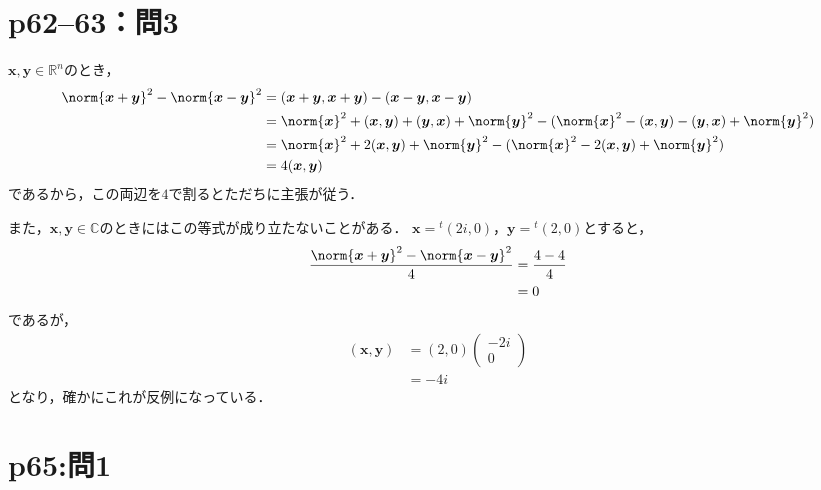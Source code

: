 \section*{p62--63：問3}

\begin{tproof}
  $\bm{x},\bm{y} \in \mathbb{R}^n$のとき，
  \begin{align*}
    \norm{\bm{x}+\bm{y}}^2 - \norm{\bm{x}-\bm{y}}^2 & = (\bm{x}+\bm{y},\bm{x}+\bm{y}) - (\bm{x}-\bm{y},\bm{x}-\bm{y})                                                                          \\
                                                    & = \norm{\bm{x}}^2 +(\bm{x},\bm{y})+(\bm{y},\bm{x})+ \norm{\bm{y}}^2 - (\norm{\bm{x}}^2 -(\bm{x},\bm{y})-(\bm{y},\bm{x})+\norm{\bm{y}}^2) \\
                                                    & = \norm{\bm{x}}^2 + 2(\bm{x},\bm{y}) + \norm{\bm{y}}^2 - (\norm{\bm{x}}^2 - 2(\bm{x},\bm{y}) + \norm{\bm{y}}^2)                          \\
                                                    & = 4(\bm{x},\bm{y})
  \end{align*}
  であるから，この両辺を$4$で割るとただちに主張が従う．

  また，$\bm{x},\bm{y} \in \mathbb{C}$のときにはこの等式が成り立たないことがある．
  $\bm{x}={}^t (2i,0)$，$\bm{y}={}^t (2,0)$とすると，
  \begin{align*}
    \frac{\norm{\bm{x}+\bm{y}}^2 - \norm{\bm{x}-\bm{y}}^2 }{4} & = \frac{4-4}{4} \\
                                                               & =0
  \end{align*}
  であるが，
  \begin{align*}
    (\bm{x},\bm{y}) & =(2,0) \begin{pmatrix} -2i  \\ 0 \end{pmatrix} \\
                    & = -4i
  \end{align*}
  となり，確かにこれが反例になっている．
\end{tproof}



\section*{p65:問1}


